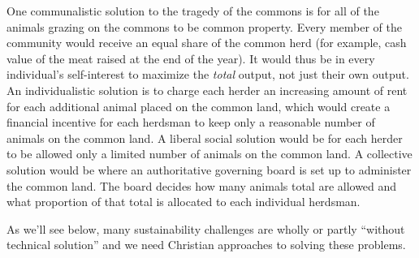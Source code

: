 \documentclass[12pt]{article}
\begin{document}
One communalistic solution to the tragedy of the commons is for all of the animals grazing on the commons to be common
property. Every member of the community would receive an equal share of the common herd (for example, cash value of the
meat raised at the end of the year). It would thus be in every individual's self-interest to maximize the \emph{total}
output, not just their own output. An individualistic solution is to charge each herder an increasing amount of rent for
each additional animal placed on the common land, which would create a financial incentive for each herdsman to keep
only a reasonable number of animals on the common land. A liberal social solution would be for each herder to be allowed
only a limited number of animals on the common land. A collective solution would be where an authoritative governing
board is set up to administer the common land. The board decides how many animals total are allowed and what proportion
of that total is allocated to each individual herdsman.

As we'll see below, many sustainability challenges are wholly or partly ``without technical solution'' and we need
Christian approaches to solving these problems.

%
%
%

\end{document}
